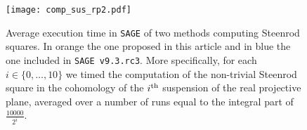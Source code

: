 \begin{figure}
	\texttt{[image: comp\_sus\_rp2.pdf]}
	\caption{Average execution time in \texttt{SAGE} of two methods computing Steenrod squares. In orange the one proposed in this article and in blue the one included in \texttt{SAGE v9.3.rc3}. More specifically, for each $i \in \{0, \dots, 10\}$ we timed the computation of the non-trivial Steenrod square in the cohomology of the $i^\mathrm{th}$ suspension of the real projective plane, averaged over a number of runs equal to the integral part of $\frac{10000}{2^i}$.}
	\label{f:comparison}
\end{figure}